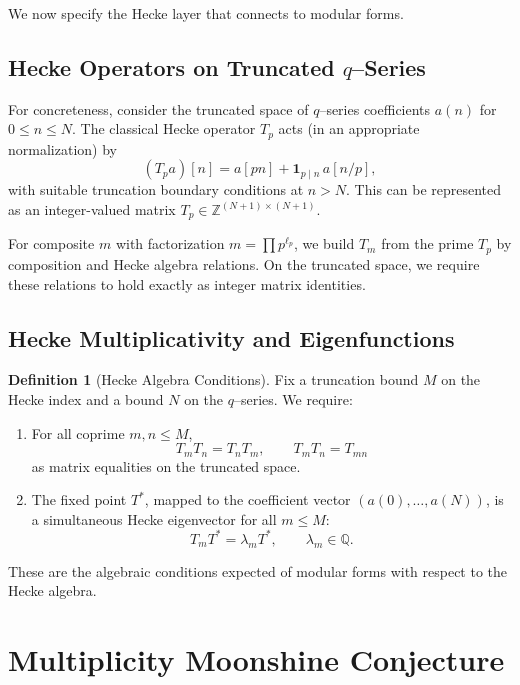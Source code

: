\documentclass[11pt]{article}
\theoremstyle{definition}
\newtheorem{definition}{Definition}[section]
\theoremstyle{plain}
\theoremstyle{remark}
\newcommand{\Zbb}{\mathbb{Z}}
\newcommand{\Qbb}{\mathbb{Q}}
\begin{document}
We now specify the Hecke layer that connects to modular forms.

\subsection{Hecke Operators on Truncated $q$--Series}

For concreteness, consider the truncated space of $q$--series coefficients $a(n)$ for $0 \le n \le N$.
The classical Hecke operator $T_p$ acts (in an appropriate normalization) by
\begin{equation}
  (T_p a)[n] = a[pn] + \mathbf{1}_{p \mid n}\, a[n/p],
\end{equation}
with suitable truncation boundary conditions at $n > N$.
This can be represented as an integer-valued matrix $T_p \in \Zbb^{(N+1)\times(N+1)}$.

For composite $m$ with factorization $m = \prod p^{\ell_p}$, we build $T_m$ from the prime $T_p$ by composition and Hecke algebra relations.
On the truncated space, we require these relations to hold exactly as integer matrix identities.

\subsection{Hecke Multiplicativity and Eigenfunctions}

\begin{definition}[Hecke Algebra Conditions]
Fix a truncation bound $M$ on the Hecke index and a bound $N$ on the $q$--series.
We require:
\begin{enumerate}[label=(H\arabic*),leftmargin=1.5em]
  \item For all coprime $m,n \le M$,
  \[
    T_m T_n = T_n T_m,\qquad T_m T_n = T_{mn}
  \]
  as matrix equalities on the truncated space.
  \item The fixed point $T^*$, mapped to the coefficient vector $(a(0),\dotsc,a(N))$, is a simultaneous Hecke eigenvector for all $m \le M$:
  \begin{equation}
    T_m T^* = \lambda_m T^*,\qquad \lambda_m \in \Qbb.
  \end{equation}
\end{enumerate}
\end{definition}

These are the algebraic conditions expected of modular forms with respect to the Hecke algebra.

\section{Multiplicity Moonshine Conjecture}
\end{document}
